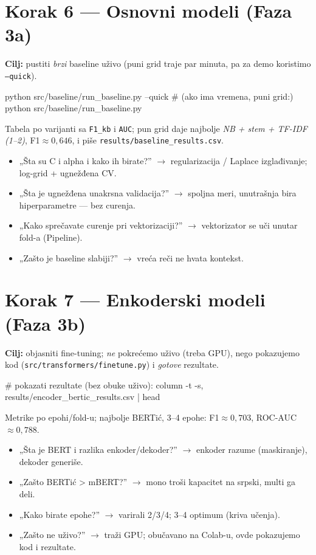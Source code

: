 \documentclass[11pt,a4paper]{article}
\newcommand{\kod}[1]{\texttt{#1}}
\begin{document}
\section{Korak 6 --- Osnovni modeli (Faza 3a)}
\textbf{Cilj:} pustiti \emph{brzi} baseline uživo (puni grid traje par minuta, pa za
demo koristimo \kod{--quick}).
\begin{cmd}
python src/baseline/run_baseline.py --quick
# (ako ima vremena, puni grid:)  python src/baseline/run_baseline.py
\end{cmd}
\begin{izlaz}
Tabela po varijanti sa \kod{F1\_kb} i \kod{AUC}; pun grid daje najbolje
\emph{NB + stem + TF-IDF (1--2)}, F1${\approx}0{,}646$, i piše
\kod{results/baseline\_results.csv}.
\end{izlaz}
\begin{pita}
\begin{itemize}[nosep]
  \item „Šta su C i alpha i kako ih birate?'' $\to$ regularizacija / Laplace
    izglađivanje; log-grid + ugnežđena CV.
  \item „Šta je ugnežđena unakrsna validacija?'' $\to$ spoljna meri, unutrašnja bira
    hiperparametre --- bez curenja.
  \item „Kako sprečavate curenje pri vektorizaciji?'' $\to$ vektorizator se uči unutar
    fold-a (Pipeline).
  \item „Zašto je baseline slabiji?'' $\to$ vreća reči ne hvata kontekst.
\end{itemize}
\end{pita}

\section{Korak 7 --- Enkoderski modeli (Faza 3b)}
\textbf{Cilj:} objasniti fine-tuning; \emph{ne} pokrećemo uživo (treba GPU), nego
pokazujemo kod (\kod{src/transformers/finetune.py}) i \emph{gotove} rezultate.
\begin{cmd}
# pokazati rezultate (bez obuke uživo):
column -t -s, results/encoder_bertic_results.csv | head
\end{cmd}
\begin{izlaz}
Metrike po epohi/fold-u; najbolje BERTić, 3--4 epohe: F1${\approx}0{,}703$,
ROC-AUC${\approx}0{,}788$.
\end{izlaz}
\begin{pita}
\begin{itemize}[nosep]
  \item „Šta je BERT i razlika enkoder/dekoder?'' $\to$ enkoder razume (maskiranje),
    dekoder generiše.
  \item „Zašto BERTić > mBERT?'' $\to$ mono troši kapacitet na srpski, multi ga deli.
  \item „Kako birate epohe?'' $\to$ varirali 2/3/4; 3--4 optimum (kriva učenja).
  \item „Zašto ne uživo?'' $\to$ traži GPU; obučavano na Colab-u, ovde pokazujemo kod i
    rezultate.
\end{itemize}
\end{pita}
\end{document}
